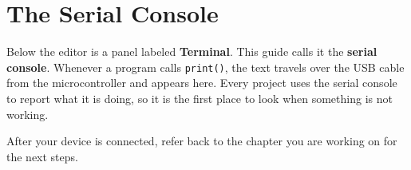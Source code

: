 \section{The Serial Console}
Below the editor is a panel labeled \textbf{Terminal}. This guide calls it the
\textbf{serial console}. Whenever a program calls \texttt{print()}, the
text travels over the USB cable from the microcontroller and appears here. Every project uses
the serial console to report what it is doing, so it is the first place to look when something
is not working.

After your device is connected, refer back to the chapter you are working on for the next steps.
